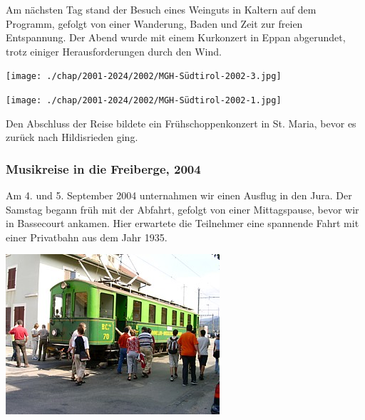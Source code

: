 \begin{history}
    Am nächsten Tag stand der Besuch eines Weinguts in Kaltern auf dem Programm,
    gefolgt von einer Wanderung, Baden und Zeit zur freien Entspannung. Der
    Abend wurde mit einem Kurkonzert in Eppan abgerundet, trotz einiger
    Herausforderungen durch den Wind.

    \begin{MulticolFigure}
        \centering
        \texttt{[image: ./chap/2001-2024/2002/MGH-Südtirol-2002-3.jpg]}
    \end{MulticolFigure}

    \begin{MulticolFigure}
        \centering
        \texttt{[image: ./chap/2001-2024/2002/MGH-Südtirol-2002-1.jpg]}
    \end{MulticolFigure}

    Den Abschluss der Reise bildete ein Frühschoppenkonzert in St. Maria, bevor
    es zurück nach Hildisrieden ging.

    \subsubsection*{Musikreise in die Freiberge, 2004}

    Am 4. und 5. September 2004 unternahmen wir einen Ausflug in den Jura. Der
    Samstag begann früh mit der Abfahrt, gefolgt von einer Mittagspause, bevor
    wir in Bassecourt ankamen. Hier erwartete die Teilnehmer eine spannende
    Fahrt mit einer Privatbahn aus dem Jahr 1935.

    \begin{MulticolFigure}
        \centering
        \includegraphics[width=0.7\linewidth]{./chap/2001-2024/2004/musikreise2004_03.jpg}
    \end{MulticolFigure}


\end{history}
